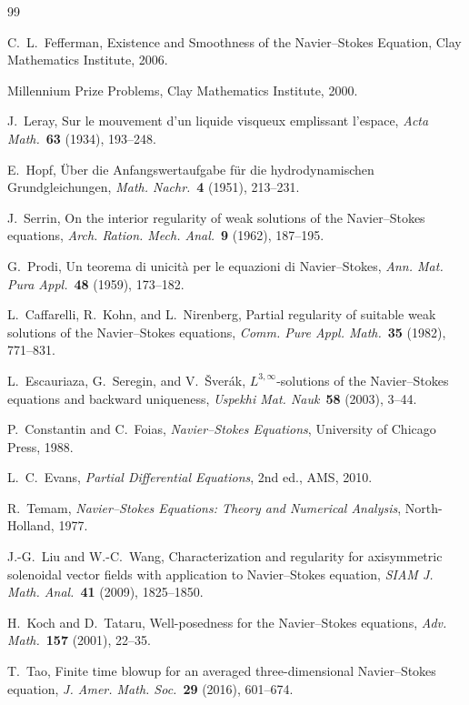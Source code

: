 \documentclass[12pt]{article}
\theoremstyle{plain}
\theoremstyle{definition}
\begin{document}
\begin{thebibliography}{99}

C.~L.~Fefferman,
Existence and Smoothness of the Navier--Stokes Equation,
Clay Mathematics Institute, 2006.

Millennium Prize Problems, Clay Mathematics Institute, 2000.

J.~Leray,
Sur le mouvement d'un liquide visqueux emplissant l'espace,
\emph{Acta Math.}\ \textbf{63} (1934), 193--248.

E.~Hopf,
\"Uber die Anfangswertaufgabe f\"ur die hydrodynamischen
Grundgleichungen,
\emph{Math. Nachr.}\ \textbf{4} (1951), 213--231.

J.~Serrin,
On the interior regularity of weak solutions of the Navier--Stokes
equations,
\emph{Arch. Ration. Mech. Anal.}\ \textbf{9} (1962), 187--195.

G.~Prodi,
Un teorema di unicit\`a per le equazioni di Navier--Stokes,
\emph{Ann. Mat. Pura Appl.}\ \textbf{48} (1959), 173--182.

L.~Caffarelli, R.~Kohn, and L.~Nirenberg,
Partial regularity of suitable weak solutions of the Navier--Stokes
equations,
\emph{Comm. Pure Appl. Math.}\ \textbf{35} (1982), 771--831.

L.~Escauriaza, G.~Seregin, and V.~\v{S}ver\'ak,
$L^{3,\infty}$-solutions of the Navier--Stokes equations and backward
uniqueness,
\emph{Uspekhi Mat. Nauk}\ \textbf{58} (2003), 3--44.

P.~Constantin and C.~Foias,
\emph{Navier--Stokes Equations},
University of Chicago Press, 1988.

L.~C.~Evans,
\emph{Partial Differential Equations}, 2nd ed.,
AMS, 2010.

R.~Temam,
\emph{Navier--Stokes Equations: Theory and Numerical Analysis},
North-Holland, 1977.

J.-G.~Liu and W.-C.~Wang,
Characterization and regularity for axisymmetric solenoidal vector
fields with application to Navier--Stokes equation,
\emph{SIAM J. Math. Anal.}\ \textbf{41} (2009), 1825--1850.

H.~Koch and D.~Tataru,
Well-posedness for the Navier--Stokes equations,
\emph{Adv. Math.}\ \textbf{157} (2001), 22--35.

T.~Tao,
Finite time blowup for an averaged three-dimensional Navier--Stokes
equation,
\emph{J. Amer. Math. Soc.}\ \textbf{29} (2016), 601--674.


\end{thebibliography}
\end{document}
